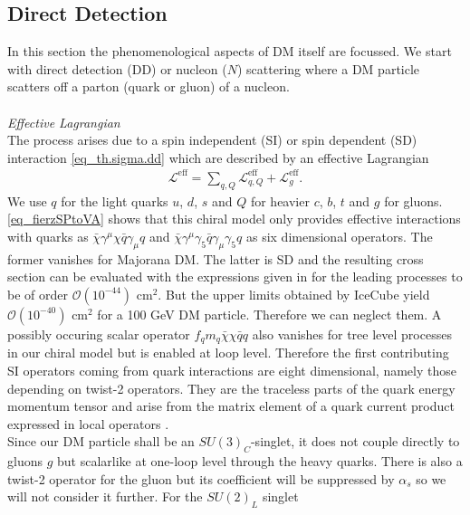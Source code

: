 \subsection{Direct Detection}
\label{sec_ddphen}
In this section the phenomenological aspects of DM itself are focussed.
We start with direct detection (DD) or nucleon ($N$) scattering where a DM particle scatters off a parton (quark or gluon) of a nucleon. 
\\ \\ \textit{Effective Lagrangian}\\
The process arises
due to a spin independent (SI) or spin dependent (SD) interaction \eqref{eq_th.sigma.dd} which are described by an effective Lagrangian \cite{1104.0228}
\begin{align}
 \mathcal{L}^\text{eff} = \sum\limits_{q,Q} \mathcal{L}^\text{eff}_{q,Q} + \mathcal{L}^\text{eff}_g.
\end{align}
We use $q$ for the light quarks $u$, $d$, $s$ and $Q$ for heavier $c$, $b$, $t$ and $g$ for gluons. \eqref{eq_fierzSPtoVA} shows that this chiral model
only provides effective interactions with quarks as $\bar \chi\gamma^\mu\chi \bar q\gamma_\mu q$ and $\bar \chi\gamma^\mu\gamma_5 \bar q\gamma_\mu \gamma_5 q$
as six dimensional operators. The former vanishes for Majorana DM. The latter is SD 
and the resulting cross section can be evaluated with the expressions given in \cite{1104.0228} for the leading processes to be of
order $\mathcal{O}(10^{-44})$ cm$^2$. But the upper limits obtained by IceCube \cite{1212.4097} yield $\mathcal{O}(10^{-40})$ cm$^2$ for 
a 100 GeV DM particle.
Therefore we can neglect them. A possibly occuring scalar operator $f_q m_q\bar \chi \chi \bar q q$ also vanishes for tree level processes in our chiral model
but is enabled at loop level. Therefore the first contributing
SI operators coming from quark interactions are eight dimensional, namely those depending on twist-2 operators. They are the traceless parts of the
quark energy momentum tensor and arise from the matrix element of a quark current product expressed in local operators \cite{MDSchwartz}. 
\\ \noindent Since our DM particle shall be an 
$SU(3)_C$-singlet, it does not couple directly to gluons $g$ but scalarlike at one-loop level through the heavy quarks. There is also a twist-2 
operator for the gluon but its coefficient will be suppressed by $\alpha_s$ so we will not consider it further. For the $SU(2)_L$ singlet
